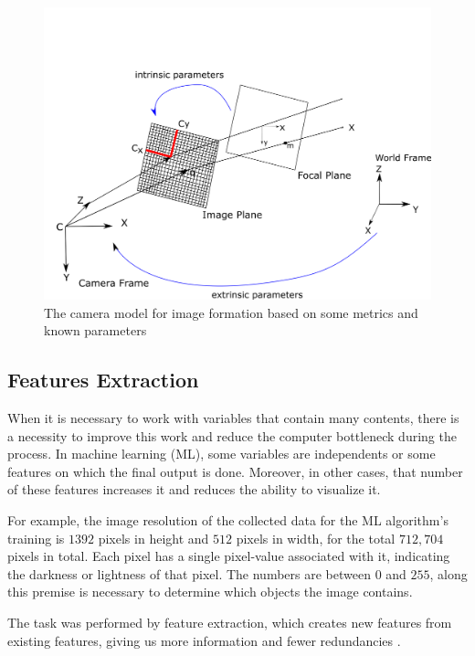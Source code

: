 \begin{figure}[H]
\centering
\includegraphics[width=\textwidth]{imagens/image_formation.png}
\caption{The camera model for image formation based on some metrics and known parameters}
\label{fig:image_formation}
\end{figure}

\subsection{Features Extraction}

When it is necessary to work with variables that contain many contents, there is a necessity to improve this work and reduce the computer bottleneck during the process. In machine learning (ML), some variables are independents or some features on which the final output is done. Moreover, in other cases, that number of these features increases it and reduces the ability to visualize it. 

For example, the image resolution of the collected data for the ML algorithm's training is $1392$ pixels in height and $512$ pixels in width, for the total $712,704$ pixels in total. Each pixel has a single pixel-value associated with it, indicating the darkness or lightness of that pixel. The numbers are between $0$ and $255$, along this premise is necessary to determine which objects the image contains.

The task was performed by feature extraction, which creates new features from existing features, giving us more information and fewer redundancies \cite{wang2019data}.

